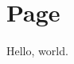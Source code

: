 \documentclass[fontsize=13pt]{scrbook}
\begin{document}
\begin{sloppypar}



\hypertarget{r}{}

\hypertarget{page}{%
\section{Page}\label{page}}

Hello, world.



\end{sloppypar}
\end{document}
